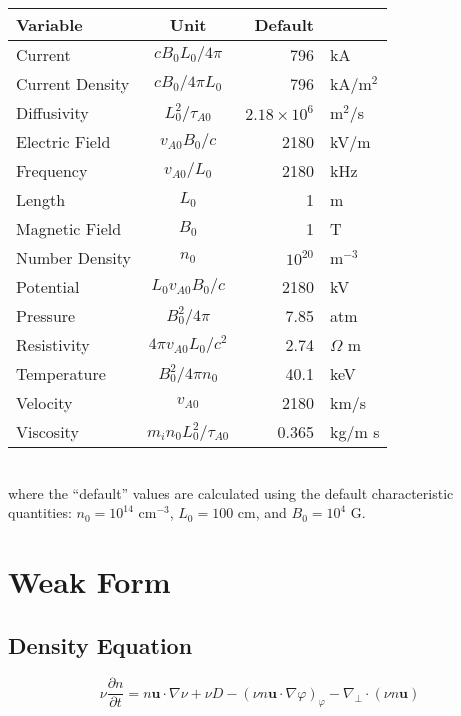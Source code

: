\documentclass[letterpaper]{book}
\newcommand{\ddt}[1]{\frac{\partial #1}{\partial t}}
\renewcommand{\vec}[1]{\ensuremath{\mathbf{#1}}}
\newcommand{\tor}{\varphi}              %
\renewcommand{\u}{\vec{u}}
\newcommand{\grad}[1]{\nabla #1}
\newcommand{\divp}[1]{\nabla_\perp \cdot #1}
\begin{document}
\begin{tabular}{lcrl}
  \textbf{Variable} & \textbf{Unit}              &  \textbf{Default} &\\
  \hline
  Current           & $c B_0 L_0 / 4\pi$         & 796       & kA\\
  Current Density   & $c B_0 / 4\pi L_0$         & 796       & kA/m$^2$\\
  Diffusivity       & $L_0^2/\tau_{A 0}$         & $2.18\times10^6$ & m$^2$/s\\
  Electric Field    & $v_{A 0} B_0/c$            & 2180      & kV/m\\
  Frequency         & $v_{A 0}/L_0$              & 2180      & kHz\\
  Length            & $L_0$                      & 1         & m \\
  Magnetic Field    & $B_0$                      & 1         & T\\
  Number Density    & $n_0$                      & $10^{20}$ & m$^{-3}$\\
  Potential         & $L_0 v_{A 0} B_0/c$        & 2180      & kV\\
  Pressure          & $B_0^2/4\pi$               & 7.85      & atm\\
  Resistivity       & $4\pi v_{A 0} L_0/c^2$     & 2.74      & $\Omega$ m\\
  Temperature       & $B_0^2/4\pi n_0$           & 40.1      & keV\\
  Velocity          & $v_{A 0}$                  & 2180      & km/s\\
  Viscosity         & $m_i n_0 L_0^2/\tau_{A 0}$ & 0.365     & kg/m s
\end{tabular}\\
where the ``default'' values are calculated using the default
characteristic quantities: $n_0 = 10^{14}$ cm$^{-3}$, $L_0 = 100$ cm,
and $B_0 = 10^4$ G.

\section{Weak Form}

\subsection{Density Equation}

\begin{equation}
  \nu \ddt{n} = 
  n \u \cdot \grad{\nu} 
  + \nu D 
  - (\nu n \u \cdot \grad{\tor})_\tor
  - \divp{(\nu n \u)}
\end{equation}
\end{document}

